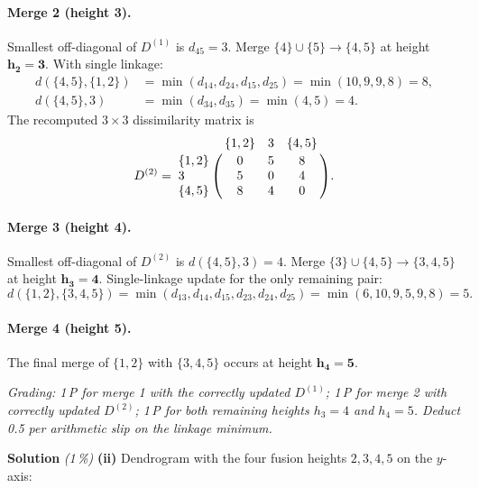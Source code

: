 \documentclass[11pt,a4paper]{article}
\newcommand{\subpoints}[1]{\textit{(#1\,\%)}}
\newcommand{\sol}{\noindent\textbf{Solution}}
\begin{document}
\paragraph{Merge 2 (height 3).} Smallest off-diagonal of $D^{(1)}$ is $d_{45}=3$. Merge $\{4\}\cup\{5\}\to\{4,5\}$
at height $\mathbf{h_2=3}$. With single linkage:
\begin{align*}
d(\{4,5\},\{1,2\}) &= \min(d_{14},d_{24},d_{15},d_{25}) = \min(10,9,9,8) = 8, \\
d(\{4,5\},3)       &= \min(d_{34},d_{35}) = \min(4,5) = 4.
\end{align*}
The recomputed $3\times 3$ dissimilarity matrix is
$$D^{(2)} = \bordermatrix{
       & \{1,2\} & 3 & \{4,5\} \cr
\{1,2\}& 0       & 5 & 8       \cr
3      & 5       & 0 & 4       \cr
\{4,5\}& 8       & 4 & 0       }.$$

\paragraph{Merge 3 (height 4).} Smallest off-diagonal of $D^{(2)}$ is $d(\{4,5\},3)=4$. Merge
$\{3\}\cup\{4,5\}\to\{3,4,5\}$ at height $\mathbf{h_3=4}$. Single-linkage update for the only remaining pair:
$$d(\{1,2\},\{3,4,5\}) = \min(d_{13},d_{14},d_{15},d_{23},d_{24},d_{25}) = \min(6,10,9,5,9,8) = 5.$$

\paragraph{Merge 4 (height 5).} The final merge of $\{1,2\}$ with $\{3,4,5\}$ occurs at height
$\mathbf{h_4=5}$.

\noindent\emph{Grading: 1\,P for merge 1 with the correctly updated $D^{(1)}$; 1\,P for merge 2 with
correctly updated $D^{(2)}$; 1\,P for both remaining heights $h_3=4$ and $h_4=5$. Deduct 0.5 per
arithmetic slip on the linkage minimum.}

\medskip
\sol{} \subpoints{1} \textbf{(ii)} Dendrogram with the four fusion heights $2,3,4,5$ on the $y$-axis:
\begin{center}
\end{center}
\end{document}
